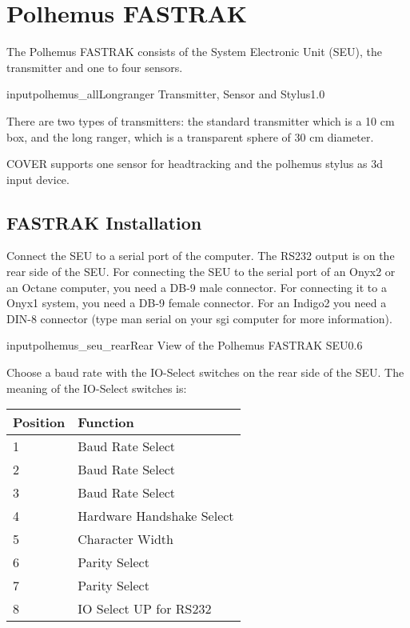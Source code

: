 \newpage



\section{Polhemus FASTRAK}
The Polhemus FASTRAK consists of the System Electronic Unit (SEU), the transmitter
and one to four sensors.


\begin{covimg}{input}{polhemus_all}{Longranger Transmitter, Sensor and Stylus}{1.0}\end{covimg}

There are two types of transmitters: the standard transmitter which is a 
10 cm box, and the long ranger, which is a transparent sphere of 30 cm
diameter.

COVER supports one sensor for headtracking and the polhemus stylus as
3d input device.


\subsection{FASTRAK Installation}
Connect the SEU to a serial port of the computer. 
The RS232 output is
on the rear side of the SEU. For connecting the
SEU to the serial port of an Onyx2 or an Octane computer, you need 
a DB-9 male connector. For connecting it to a Onyx1 system,
you need a DB-9 female connector. For an Indigo2 you need a 
DIN-8 connector (type man serial on your sgi computer for more information).

\begin{covimg}{input}{polhemus_seu_rear}{Rear View of the Polhemus FASTRAK SEU}{0.6}\end{covimg}

Choose a baud rate with the IO-Select switches on the rear side of the SEU. 
The meaning of the  IO-Select switches is:

\begin{longtable}{|p{2cm}|p{6cm}|}
\hline
\bf{Position} & \bf{Function} \\
\hline\hline
1  &  Baud Rate Select \\
\hline
2  &  Baud Rate Select  \\
\hline
3  &  Baud Rate Select  \\
\hline
4  &  Hardware Handshake Select  \\
\hline
5  &  Character Width  \\
\hline
6  &  Parity Select  \\
\hline
7  &  Parity Select  \\
\hline
8  &  IO Select UP for RS232  \\
\hline
\end{longtable}

